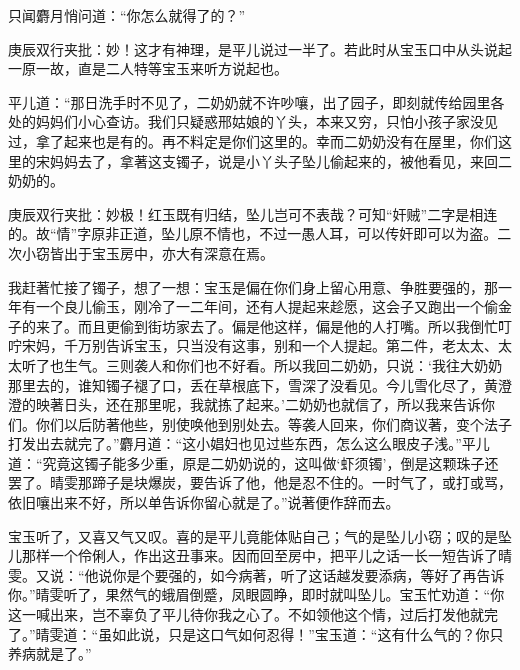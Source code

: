 \begin{parag}
    只闻麝月悄问道：“你怎么就得了的？”\begin{note}庚辰双行夹批：妙！这才有神理，是平儿说过一半了。若此时从宝玉口中从头说起一原一故，直是二人特等宝玉来听方说起也。\end{note}平儿道：“那日洗手时不见了，二奶奶就不许吵嚷，出了园子，即刻就传给园里各处的妈妈们小心查访。我们只疑惑邢姑娘的丫头，本来又穷，只怕小孩子家没见过，拿了起来也是有的。再不料定是你们这里的。幸而二奶奶没有在屋里，你们这里的宋妈妈去了，拿著这支镯子，说是小丫头子坠儿偷起来的，被他看见，来回二奶奶的。\begin{note}庚辰双行夹批：妙极！红玉既有归结，坠儿岂可不表哉？可知“奸贼”二字是相连的。故“情”字原非正道，坠儿原不情也，不过一愚人耳，可以传奸即可以为盗。二次小窃皆出于宝玉房中，亦大有深意在焉。\end{note}我赶著忙接了镯子，想了一想：宝玉是偏在你们身上留心用意、争胜要强的，那一年有一个良儿偷玉，刚冷了一二年间，还有人提起来趁愿，这会子又跑出一个偷金子的来了。而且更偷到街坊家去了。偏是他这样，偏是他的人打嘴。所以我倒忙叮咛宋妈，千万别告诉宝玉，只当没有这事，别和一个人提起。第二件，老太太、太太听了也生气。三则袭人和你们也不好看。所以我回二奶奶，只说：‘我往大奶奶那里去的，谁知镯子褪了口，丢在草根底下，雪深了没看见。今儿雪化尽了，黄澄澄的映著日头，还在那里呢，我就拣了起来。’二奶奶也就信了，所以我来告诉你们。你们以后防著他些，别使唤他到别处去。等袭人回来，你们商议著，变个法子打发出去就完了。”麝月道：“这小娼妇也见过些东西，怎么这么眼皮子浅。”平儿道：“究竟这镯子能多少重，原是二奶奶说的，这叫做‘虾须镯’，倒是这颗珠子还罢了。晴雯那蹄子是块爆炭，要告诉了他，他是忍不住的。一时气了，或打或骂，依旧嚷出来不好，所以单告诉你留心就是了。”说著便作辞而去。
\end{parag}


\begin{parag}
    宝玉听了，又喜又气又叹。喜的是平儿竟能体贴自己；气的是坠儿小窃；叹的是坠儿那样一个伶俐人，作出这丑事来。因而回至房中，把平儿之话一长一短告诉了晴雯。又说：“他说你是个要强的，如今病著，听了这话越发要添病，等好了再告诉你。”晴雯听了，果然气的蛾眉倒蹙，凤眼圆睁，即时就叫坠儿。宝玉忙劝道：“你这一喊出来，岂不辜负了平儿待你我之心了。不如领他这个情，过后打发他就完了。”晴雯道：“虽如此说，只是这口气如何忍得！”宝玉道：“这有什么气的？你只养病就是了。”
\end{parag}


